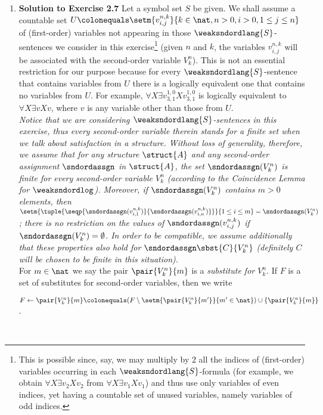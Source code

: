 \begin{enumerate}[1.]
\item \textbf{Solution to Exercise 2.7} Let a symbol set $S$ be given. We shall assume a countable set $U \colonequals \setm{v^{n, k}_{i, j}}{k \in \nat, n > 0, i > 0, 1 \leq j \leq n}$ of (first-order) variables not appearing in those $\weaksndordlang{S}$-sentences we consider in this exercise\footnote{This is possible since, say, we may multiply by $2$ all the indices of (first-order) variables occurring in each $\weaksndordlang{S}$-formula (for example, we obtain $\forall X \exists v_2 Xv_2$ from $\forall X \exists v_1 Xv_1$) and thus use only variables of even indices, yet having a countable set of unused variables, namely variables of odd indices.} (given $n$ and $k$, the variables $v^{n, k}_{i, j}$ will be associated with the second-order variable $V^n_k$). This is not an essential restriction for our purpose because for every $\weaksndordlang{S}$-sentence that contains variables from $U$ there is a logically equivalent one that contains no variables from $U$. For example, $\forall X \exists v^{1, 0}_{3, 1} X v^{1, 0}_{3, 1}$ is logically equivalent to $\forall X \exists v X v$, where $v$ is any variable other than those from $U$.\bigskip\\
\emph{Notice that we are considering $\weaksndordlang{S}$-\emph{sentences} in this exercise, thus every second-order variable therein stands for a \emph{finite} set when we talk about satisfaction in a structure. Without loss of generality, therefore, we assume that for any structure $\struct{A}$ and any second-order assignment $\sndordassgn$ in $\struct{A}$, the set $\sndordassgn(V^n_k)$ is finite for every second-order variable $V^n_k$ (according to the Coincidence Lemma for $\weaksndordlog$). Moreover, if $\sndordassgn(V^n_k)$ contains $m > 0$ elements, then $\setm{\tuple{\seqp{\sndordassgn(v^{n, k}_{i, 1})}{\sndordassgn(v^{n, k}_{i, n})}}}{1 \leq i \leq m} = \sndordassgn(V^n_k)$; there is no restriction on the values of $\sndordassgn(v^{n, k}_{i, j})$ if $\sndordassgn(V^n_k) = \emptyset$. In order to be compatible, we assume additionally that these properties also hold for $\sndordassgn\sbst{C}{V^n_k}$ (definitely $C$ will be chosen to be finite in this situation).}\bigskip\\
For $m \in \nat$ we say the pair $\pair{V^n_k}{m}$ is a \emph{substitute for $V^n_k$}. If $F$ is a set of substitutes for second-order variables, then we write\smallskip\\
\centerline{$F \leftarrow \pair{V^n_k}{m} \colonequals (F \setminus \setm{\pair{V^n_k}{m^\prime}}{m^\prime \in \nat}) \cup \{ \pair{V^n_k}{m} \}$.}\bigskip\\

\end{enumerate}
